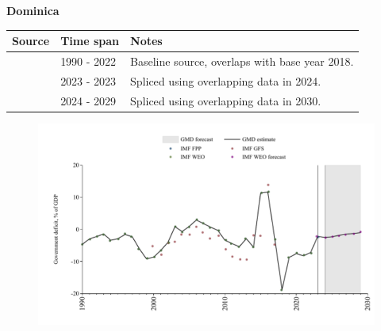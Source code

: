 \documentclass[12pt,a4paper,landscape]{article}
\begin{document}
\begin{adjustbox}{max totalsize={\paperwidth}{\paperheight},center}
\begin{minipage}[t][\textheight][t]{\textwidth}
\vspace*{0.5cm}
{}
\begin{center}
{\Large\bfseries Dominica}
\end{center}
\vspace{0.5cm}
\begin{table}[H]
\centering
\small
\begin{tabular}{|l|l|l|}
\hline
\textbf{Source} & \textbf{Time span} & \textbf{Notes} \\
\hline
\rowcolor{white}\cite{IMF_WEO}& 1990 - 2022 &Baseline source, overlaps with base year 2018.\\
\rowcolor{lightgray}\cite{IMF_FPP}& 2023 - 2023 &Spliced using overlapping data in 2024.\\
\rowcolor{white}\cite{IMF_WEO_forecast}& 2024 - 2029 &Spliced using overlapping data in 2030.\\
\hline
\end{tabular}
\end{table}
\begin{figure}[H]
\centering
\includegraphics[width=\textwidth,height=0.6\textheight,keepaspectratio]{graphs/DMA_govdef_GDP.pdf}
\end{figure}
\end{minipage}
\end{adjustbox}
\end{document}
